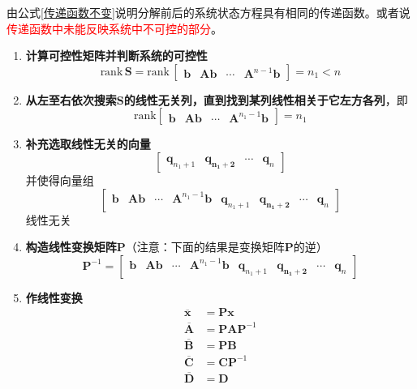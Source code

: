 由公式\eqref{传递函数不变}说明分解前后的系统状态方程具有相同的传递函数。或者说\textcolor{red}{传递函数中未能反映系统中不可控的部分}。

\vspace*{0.5em}

\example[系统的可控性分解]
\vspace*{-1em}
\begin{enumerate}[\textbf{步骤} 1 ]
	\item \textbf{计算可控性矩阵并判断系统的可控性}
	\begin{equation}
		\text{rank}\, \bm{S} = \text{rank}\,
		\begin{bmatrix}
			\bm{b} & \bm{Ab} & \cdots & \bm{A}^{n-1}\bm{b}
		\end{bmatrix} = n_1 < n
	\end{equation}
	\item \textbf{从左至右依次搜索$\bm{S}$的线性无关列，直到找到某列线性相关于它左方各列}，即
	\begin{equation}
		\text{rank} 
		\begin{bmatrix}
			\bm{b} &  \bm{Ab} & \cdots & \bm{A}^{n_1-1}\bm{b}
		\end{bmatrix}
	 = n_1
	\end{equation}
	
	\item \textbf{补充选取线性无关的向量}
	\begin{equation}
		\begin{bmatrix}
		 \bm{q}_{n_1+1} & \bm{q_{n_1+2}} & \cdots & \bm{q}_n
		\end{bmatrix}
	\end{equation}
	并使得向量组
	\begin{equation}
		\begin{bmatrix}
			\bm{b} & \bm{Ab} & \cdots & \bm{A}^{n_1 - 1}\bm{b} & \bm{q}_{n_1+1} & \bm{q_{n_1+2}} & \cdots & \bm{q}_n
		\end{bmatrix}
	\end{equation}
	线性无关
	\item \textbf{构造线性变换矩阵$\bm{P}$}（注意：下面的结果是变换矩阵$\bm{P}$的逆）
	\begin{equation}
		\bm{P}^{-1} = 
		\begin{bmatrix}
			\bm{b} & \bm{Ab} & \cdots & \bm{A}^{n_1 - 1}\bm{b} & \bm{q}_{n_1+1} & \bm{q_{n_1+2}} & \cdots & \bm{q}_n
		\end{bmatrix}
	\end{equation}
	\item \textbf{作线性变换}
	\begin{align}
		\overline{\bm{x}} & = \bm{Px}\\
		\overline{\bm{A}} & = \bm{PAP}^{-1}\\
		\overline{\bm{B}} & = \bm{PB}\\
		\overline{\bm{C}} & = \bm{CP}^{-1}\\
		\overline{\bm{D}} & = \bm{D}
	\end{align}
\end{enumerate}

